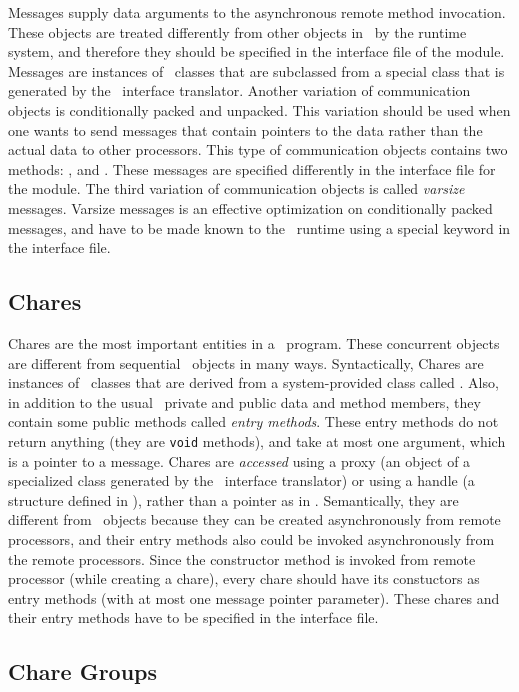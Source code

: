 Messages supply data arguments to the asynchronous remote method invocation.
These objects are treated differently from other objects in \charmpp\ by the
runtime system, and therefore they should be specified in the interface file of
the module.  Messages are instances of \CC\ classes that are subclassed from a
special class that is generated by the \charmpp\ interface translator.  Another
variation of communication objects is conditionally packed and unpacked. This
variation should be used when one wants to send messages that contain pointers
to the data rather than the actual data to other processors. This type of
communication objects contains two methods: , and .
These messages are specified differently in the interface file for the module.
The third variation of communication objects is called {\em varsize} messages.
Varsize messages is an effective optimization on conditionally packed messages,
and have to be made known to the \charmpp\ runtime using a special keyword in
the interface file.

\subsection{Chares}

Chares are the most important entities in a \charmpp\ program. These concurrent
objects are different from sequential \CC\ objects in many ways. Syntactically,
Chares are instances of \CC\  classes that are derived from a system-provided
class called . Also, in addition to the usual \CC\ private and
public data and method members, they contain some public methods called {\em
entry methods}. These entry methods do not return anything (they are {\tt void}
methods), and take at most one argument, which is a pointer to a message.
Chares are {\em accessed} using a proxy (an object of a specialized class
generated by the \charmpp\ interface translator) or using a handle (a  structure defined in \charmpp), rather than a pointer as in \CC.
Semantically, they are different from \CC\ objects because they can be created
asynchronously from remote processors, and their entry methods also could be
invoked asynchronously from the remote processors. Since the constructor method
is invoked from remote processor (while creating a chare), every chare should
have its constuctors as entry methods (with at most one message pointer
parameter). These chares and their entry methods have to be specified in the
interface file.

\subsection{Chare Groups}

